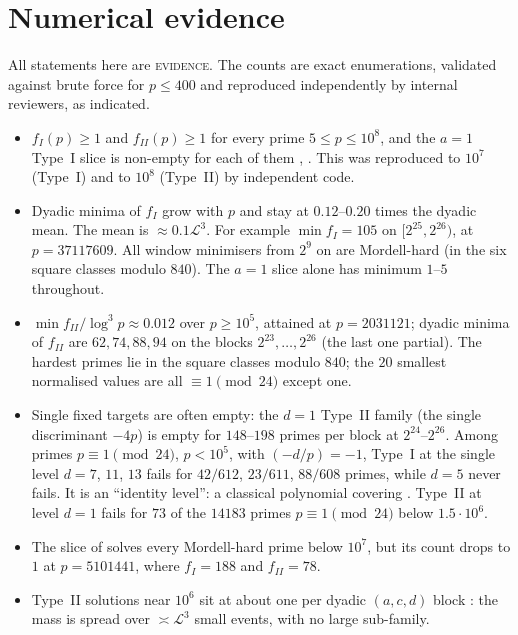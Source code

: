 \documentclass[10pt,reqno]{amsart}
\theoremstyle{definition}
\numberwithin{equation}{section}
\newcommand{\cL}{\mathcal L}
\newcommand{\status}[1]{\textup{\textsc{#1}}}
\begin{document}
\section{Numerical evidence}\label{sec:numerics}
All statements here are \status{evidence}. The counts are exact
enumerations, validated against brute force for $p\le400$ and reproduced
independently by internal reviewers, as indicated.
\begin{itemize}
\item $f_I(p)\ge1$ and $f_{II}(p)\ge1$ for every prime $5\le p\le10^8$, and the
$a=1$ Type~I slice is non-empty for each of them \cite[\S1]{O123},
\cite[\S10]{O128}. This was reproduced to $10^7$ (Type~I) and to $10^8$
(Type~II) by independent code.
\item Dyadic minima of $f_I$ grow with $p$ and stay at $0.12$--$0.20$ times
the dyadic mean. The mean is $\approx0.1\cL^3$. For example
$\min f_I=105$ on $[2^{25},2^{26})$, at $p=37117609$. All window minimisers
from $2^9$ on are Mordell-hard (in the six square classes modulo $840$).
The $a=1$ slice alone has minimum $1$--$5$ throughout.
\item $\min f_{II}/\log^3p\approx0.012$ over $p\ge10^5$, attained at
$p=2031121$; dyadic minima of $f_{II}$ are $62,74,88,94$ on the blocks
$2^{23},\dots,2^{26}$ (the last one partial). The hardest primes lie in
the square classes modulo $840$; the $20$ smallest normalised values are all
$\equiv1\pmod{24}$ except one.
\item Single fixed targets are often empty: the $d=1$ Type~II family
(the single discriminant $-4p$) is empty for $148$--$198$ primes per block
at $2^{24}$--$2^{26}$. Among primes $p\equiv1\pmod{24}$, $p<10^5$, with
$(-d/p)=-1$, Type~I at the single level $d=7$, $11$, $13$ fails for
$42/612$, $23/611$, $88/608$ primes, while $d=5$ never fails. It is an
``identity level'': a classical polynomial covering \cite[\S5.3]{O126}.
Type~II at level $d=1$ fails for $73$ of the $14183$ primes
$p\equiv1\pmod{24}$ below $1.5\cdot10^6$.
\item The slice of \cite[Lemma~1.1]{O127} solves every Mordell-hard prime
below $10^7$, but its count drops to $1$ at $p=5101441$, where
$f_I=188$ and $f_{II}=78$.
\item Type~II solutions near $10^6$ sit at about one per dyadic $(a,c,d)$
block \cite[\S3.1]{RT2}: the mass is spread over $\asymp\cL^3$ small
events, with no large sub-family.
\end{itemize}
\end{document}
